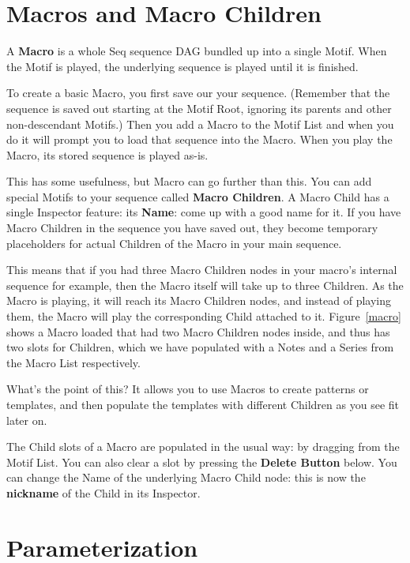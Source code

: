 \documentclass[twoside,10pt]{article}
\begin{document}
\section{Macros and Macro Children}

A {\bf Macro} is a whole Seq sequence DAG bundled up into a single Motif.  When the Motif is played, the underlying sequence is played until it is finished.

To create a basic Macro, you first save our your sequence.  (Remember that the sequence is saved out starting at the Motif Root, ignoring its parents and other non-descendant Motifs.)  Then you add a Macro to the Motif List and when you do it will prompt you to load that sequence into the Macro.    When you play the Macro, its stored sequence is played as-is.

This has some usefulness, but Macro can go further than this.  You can add special Motifs to your sequence called {\bf Macro Children}.  A Macro Child has a single Inspector feature: its {\bf Name}: come up with a good name for it.  If you have Macro Children in the sequence you have saved out, they become temporary placeholders for actual Children of the Macro in  your main sequence.

This means that if you had three Macro Children nodes in your macro's internal sequence for example, then the Macro itself will take up to three Children.  As the Macro is playing, it will reach its Macro Children nodes, and instead of playing them, the Macro will play the corresponding Child attached to it.  Figure~\ref{macro} shows a Macro loaded that had two Macro Children nodes inside, and thus has two slots for Children, which we have populated with a Notes and a Series from the Macro List respectively.

What's the point of this?  It allows you to use Macros to create patterns or templates, and then populate the templates with different Children as you see fit later on. 

The Child slots of a Macro are populated in the usual way: by dragging from the Motif List.  You can also clear a slot by pressing the {\bf Delete Button} below.  You can change the Name of the underlying Macro Child node: this is now the {\bf nickname} of the Child in its Inspector.

\clearpage\section{Parameterization}
\label{parameters}
\end{document}
